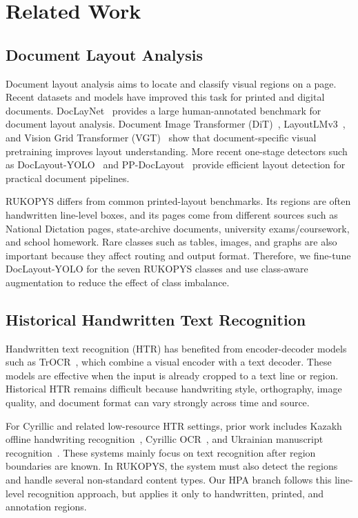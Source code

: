 \documentclass[runningheads]{llncs}
\begin{document}
\section{Related Work}
\label{sec:related}

\subsection{Document Layout Analysis}
Document layout analysis aims to locate and classify visual regions on a page. Recent datasets and models have improved this task for printed and digital documents. DocLayNet~\cite{pfitzmann2022doclaynet} provides a large human-annotated benchmark for document layout analysis. Document Image Transformer (DiT)~\cite{li2022dit}, LayoutLMv3~\cite{huang2022layoutlmv3}, and Vision Grid Transformer (VGT)~\cite{da2023vgt} show that document-specific visual pretraining improves layout understanding. More recent one-stage detectors such as DocLayout-YOLO~\cite{zhao2024doclayoutyolo} and PP-DocLayout~\cite{sun2025ppdoclayout} provide efficient layout detection for practical document pipelines.

RUKOPYS \cite{rukopys_2026} differs from common printed-layout benchmarks. Its regions are often handwritten line-level boxes, and its pages come from different sources such as National Dictation pages, state-archive documents, university exams/coursework, and school homework. Rare classes such as tables, images, and graphs are also important because they affect routing and output format. Therefore, we fine-tune DocLayout-YOLO for the seven RUKOPYS classes and use class-aware augmentation to reduce the effect of class imbalance.

\subsection{Historical Handwritten Text Recognition}
Handwritten text recognition (HTR) has benefited from encoder-decoder models such as TrOCR~\cite{li2023trocr}, which combine a visual encoder with a text decoder. These models are effective when the input is already cropped to a text line or region. Historical HTR remains difficult because handwriting style, orthography, image quality, and document format can vary strongly across time and source.

For Cyrillic and related low-resource HTR settings, prior work includes Kazakh offline handwriting recognition~\cite{toiganbayeva2022kohtd}, Cyrillic OCR~\cite{liepieshov2019cyrillic}, and Ukrainian manuscript recognition~\cite{tikhonov2024ukrainian}. These systems mainly focus on text recognition after region boundaries are known. In RUKOPYS, the system must also detect the regions and handle several non-standard content types. Our HPA branch follows this line-level recognition approach, but applies it only to handwritten, printed, and annotation regions.
\end{document}

